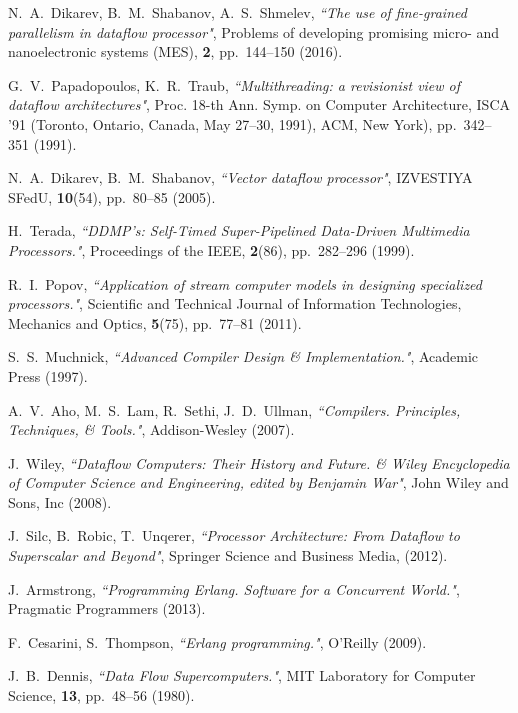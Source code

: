 \documentclass[
11pt,%
tightenlines,%
twoside,%
onecolumn,%
nofloats,%
nobibnotes,%
nofootinbib,%
superscriptaddress,%
noshowpacs,%
centertags]%
{revtex4}
\begin{document}
\begin{thebibliography}{99}

N.~A.~Dikarev, B.~M.~Shabanov, A.~S.~Shmelev, {\it ``The use of fine-grained parallelism in dataflow processor"}, Problems of developing promising micro- and nanoelectronic systems (MES), {\bf 2}, pp.~144--150 (2016).

G.~V.~Papadopoulos, K.~R.~Traub, {\it ``Multithreading: a revisionist view of
dataflow architectures"}, Proc. 18-th Ann. Symp. on Computer Architecture,
ISCA ’91 (Toronto, Ontario, Canada, May 27–30, 1991), ACM, New York), pp.~342--351 (1991).

N.~A.~Dikarev, B.~M.~Shabanov, {\it ``Vector dataflow processor"}, IZVESTIYA SFedU, {\bf 10}(54), pp.~80--85 (2005).

H.~Terada, {\it ``DDMP’s: Self-Timed Super-Pipelined Data-Driven Multimedia Processors."}, Proceedings of the IEEE, {\bf 2}(86), pp.~282--296 (1999).

R.~I.~Popov, {\it ``Application of stream computer models in designing specialized processors."}, Scientific and Technical Journal of Information Technologies, Mechanics and Optics, {\bf 5}(75), pp.~77--81 (2011).

S.~S.~Muchnick, {\it ``Advanced Compiler Design \& Implementation."}, Academic Press (1997).

A.~V.~Aho, M.~S.~Lam, R.~Sethi, J.~D.~Ullman, {\it ``Compilers. Principles, Techniques, \& Tools."}, Addison-Wesley (2007).

J.~Wiley, {\it ``Dataflow Computers: Their History and Future. \& Wiley Encyclopedia of Computer Science and Engineering, edited by Benjamin War"}, John Wiley and Sons, Inc (2008).

J.~Silc, B.~Robic, T.~Unqerer, {\it ``Processor Architecture: From Dataflow to Superscalar and Beyond"}, Springer Science and Business Media, (2012).

J.~Armstrong, {\it ``Programming Erlang. Software for a Concurrent World."}, Pragmatic Programmers (2013).

F.~Cesarini, S.~Thompson, {\it ``Erlang programming."}, O'Reilly (2009).

J.~B.~Dennis, {\it ``Data Flow Supercomputers."}, MIT Laboratory for Computer Science, {\bf 13}, pp.~48--56 (1980).

\end{thebibliography}
\end{document}
